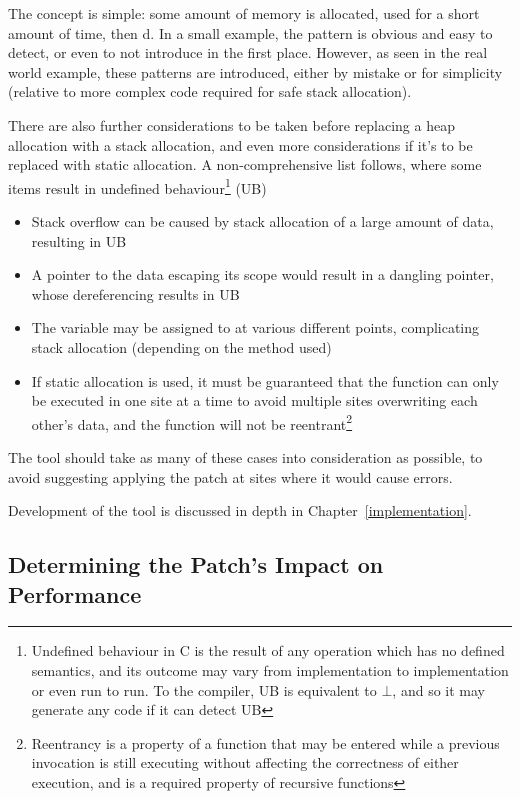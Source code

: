 The concept is simple: some amount of memory is allocated, used for a short amount of time, then \free{}d. In a small example, the pattern is obvious and easy to detect, or even to not introduce in the first place. However, as seen in the real world  example, these patterns are introduced, either by mistake or for simplicity (relative to more complex code required for safe stack allocation).

There are also further considerations to be taken before replacing a heap allocation with a stack allocation, and even more considerations if it's to be replaced with static allocation. A non-comprehensive list follows, where some items result in undefined behaviour\footnote{Undefined behaviour in C is the result of any operation which has no defined semantics, and its outcome may vary from implementation to implementation or even run to run. To the compiler, UB is equivalent to $\bot$, and so it may generate any code if it can detect UB} (UB)

\begin{itemize}
	\itemsep-0.25em
	\item Stack overflow can be caused by stack allocation of a large amount of data, resulting in UB
	\item A pointer to the data escaping its scope would result in a dangling pointer, whose dereferencing results in UB
	\item The variable may be assigned to at various different points, complicating stack allocation (depending on the method used)
	\item If static allocation is used, it must be guaranteed that the function can only be executed in one site at a time to avoid multiple sites overwriting each other's data, and the function will not be reentrant\footnote{Reentrancy is a property of a function that may be entered while a previous invocation is still executing without affecting the correctness of either execution, and is a required property of recursive functions}
\end{itemize}

The tool should take as many of these cases into consideration as possible, to avoid suggesting applying the patch at sites where it would cause errors.

Development of the tool is discussed in depth in Chapter~\ref{implementation}.

\subsection{Determining the Patch's Impact on Performance}

